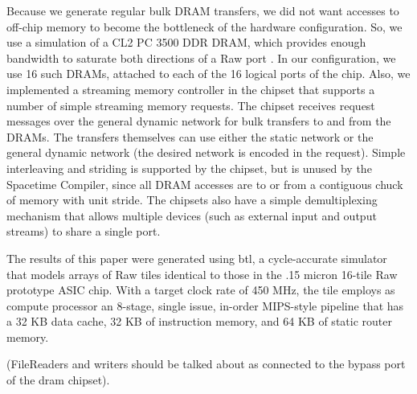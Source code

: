Because we generate regular bulk DRAM transfers, we did not want
accesses to off-chip memory to become the bottleneck of the hardware
configuration.  So, we use a simulation of a CL2 PC 3500 DDR DRAM,
which provides enough bandwidth to saturate both directions of a Raw
port \cite{raw_isca}.  In our configuration, we use 16 such DRAMs,
attached to each of the 16 logical ports of the chip.  Also, we
implemented a streaming memory controller in the chipset that supports
a number of simple streaming memory requests.  The chipset receives
request messages over the general dynamic network for bulk transfers
to and from the DRAMs.  The transfers themselves can use either the
static network or the general dynamic network (the desired network is
encoded in the request).  Simple interleaving and striding is
supported by the chipset, but is unused by the Spacetime Compiler,
since all DRAM accesses are to or from a contiguous chuck of memory
with unit stride. The chipsets also have a simple demultiplexing
mechanism that allows multiple devices (such as external input and
output streams) to share a single port.

The results of this paper were generated using btl, a cycle-accurate
simulator that models arrays of Raw tiles identical to those in the
.15 micron 16-tile Raw prototype ASIC chip.  With a target clock rate
of 450 MHz, the tile employs as compute processor an 8-stage, single
issue, in-order MIPS-style pipeline that has a 32 KB data cache, 32 KB
of instruction memory, and 64 KB of static router memory.

(FileReaders and writers should be talked about as connected to the
bypass port of the dram chipset).